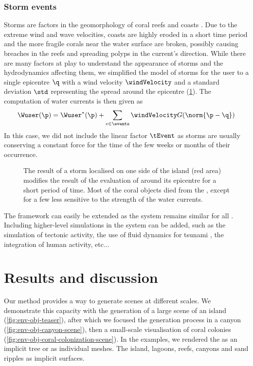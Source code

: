 \subsubsection{Storm events}
Storms are factors in the geomorphology of coral reefs \cite{VilaConcejo2016, Oron2023} and coasts \cite{Dominguez2005, Cowart2010}. Due to the extreme wind and wave velocities, coasts are highly eroded in a short time period and the more fragile corals near the water surface are broken, possibly causing breaches in the reefs and spreading polyps in the current's direction. While there are many factors at play to understand the appearance of storms and the hydrodynamics affecting them, we simplified the model of storms for the user to a single epicentre $\q$ with a wind velocity $\windVelocity$ and a standard deviation $\std$ representing the spread around the epicentre (\cref{fig:env-obj-storm-event}). The computation of water currents is then given as
\begin{align*}
    \Wuser(\p) = \Wuser^*(\p) + \sum_{e \in \events} {\windVelocity G(\norm{\p - \q})}
\end{align*}
In this case, we did not include the linear factor $\tEvent$ as storms are usually conserving a constant force for the time of the few weeks or months of their occurrence. 

\begin{figure}
    \caption{The result of a storm localised on one side of the island (red area) modifies the result of the evaluation of  around its epicentre for a short period of time. Most of the coral objects died from the , except for a few  less sensitive to the strength of the water currents.}
    \label{fig:env-obj-storm-event}
\end{figure}

\midConclusion

The framework can easily be extended as the  system remains similar for all . Including higher-level simulations in the  system can be added, such as the simulation of tectonic activity, the use of fluid dynamics for tsunami , the integration of human activity, etc...

\section{Results and discussion}
\label{sec:env-obj-results}
Our method provides a way to generate scenes at different scales. We demonstrate this capacity with the generation of a large scene of an island (\cref{fig:env-obj-teaser}), after which we focused the generation process in a canyon (\cref{fig:env-obj-canyon-scene}), then a small-scale visualisation of coral colonies (\cref{fig:env-obj-coral-colonization-scene}).
In the examples, we rendered the  as an implicit tree or as individual meshes. The island, lagoons, reefs, canyons and sand ripples as implicit surfaces.

